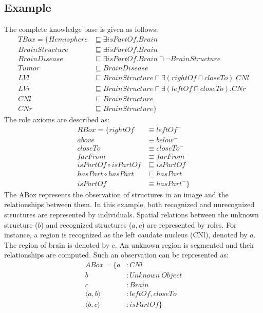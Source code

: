 \documentclass{article}
\begin{document}
\subsection{Example}
 The complete knowledge base is given as follows:
\begin{align*}
 TBox=\{ Hemisphere &\sqsubseteq \exists isPartOf. Brain\\
	 BrainStructure &\sqsubseteq \exists isPartOf. Brain\\
	 BrainDisease &\sqsubseteq \exists isPartOf. Brain \sqcap \neg BrainStructure\\
	 Tumor  &\sqsubseteq BrainDisease\\
	 LVl &\sqsubseteq BrainStructure \sqcap \exists (rightOf \sqcap closeTo). CNl\\
	 LVr &\sqsubseteq BrainStructure \sqcap \exists (leftOf \sqcap closeTo). CNr\\
	 CNl &\sqsubseteq BrainStructure\\
	 CNr &\sqsubseteq BrainStructure\}
\end{align*}
The role axioms are described as:
\begin{align*}
 RBox=\{ rightOf &\equiv leftOf^-\\
         above &\equiv below^- \\
	 closeTo &\equiv closeTo^- \\
	 farFrom &\equiv farFrom^- \\
	 isPartOf \circ isPartOf &\sqsubseteq isPartOf \\
	 hasPart \circ hasPart &\sqsubseteq hasPart\\
	 isPartOf &\equiv hasPart^-\}
\end{align*}
The ABox represents the observation of structures in an image and the relationships between them.
In this example, both recognized and unrecognized structures are represented by individuals. Spatial relations between the unknown structure ($b$) and
recognized structures ($a,c$) are represented by roles.
For instance, a region is recognized as the left caudate nucleus (CNl), denoted by $a$.
The region of brain is denoted by $c$. An unknown region is segmented and their relationships are computed.  
Such an observation can be represented as:
\begin{align*}
 ABox=\{ a&: CNl \\
	 b&: Unknown~Object \\
	 c&: Brain \\
	 \langle a,b\rangle &: leftOf, closeTo \\
	 \langle b,c\rangle &: isPartOf\}
\end{align*}
\end{document}
